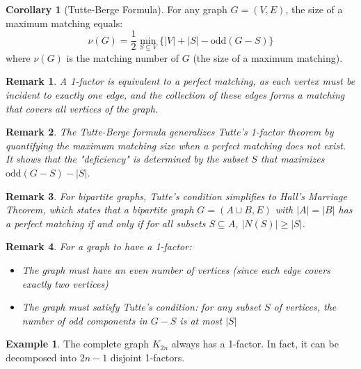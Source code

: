\documentclass{article}
\newtheorem{remark}{Remark}
\theoremstyle{definition}
\newtheorem{example}{Example}
\newtheorem{corollary}{Corollary}
\begin{document}
\begin{corollary}[Tutte-Berge Formula]
For any graph $G = (V, E)$, the size of a maximum matching equals:
\[
\nu(G) = \frac{1}{2} \min_{S \subseteq V} \{|V| + |S| - \text{odd}(G - S)\}
\]
where $\nu(G)$ is the matching number of $G$ (the size of a maximum matching).
\end{corollary}

\begin{remark}
A 1-factor is equivalent to a perfect matching, as each vertex must be incident to exactly one edge, and the collection of these edges forms a matching that covers all vertices of the graph.
\end{remark}

\begin{remark}
The Tutte-Berge formula generalizes Tutte's 1-factor theorem by quantifying the maximum matching size when a perfect matching does not exist. It shows that the "deficiency" is determined by the subset $S$ that maximizes $\text{odd}(G - S) - |S|$.
\end{remark}

\begin{remark}
For bipartite graphs, Tutte's condition simplifies to Hall's Marriage Theorem, which states that a bipartite graph $G = (A \cup B, E)$ with $|A| = |B|$ has a perfect matching if and only if for all subsets $S \subseteq A$, $|N(S)| \geq |S|$.
\end{remark}

\begin{remark}
For a graph to have a 1-factor:
\begin{itemize}
\item The graph must have an even number of vertices (since each edge covers exactly two vertices)
\item The graph must satisfy Tutte's condition: for any subset $S$ of vertices, the number of odd components in $G - S$ is at most $|S|$
\end{itemize}
\end{remark}

\begin{example}
The complete graph $K_{2n}$ always has a 1-factor. In fact, it can be decomposed into $2n-1$ disjoint 1-factors.
\end{example}
\end{document}
